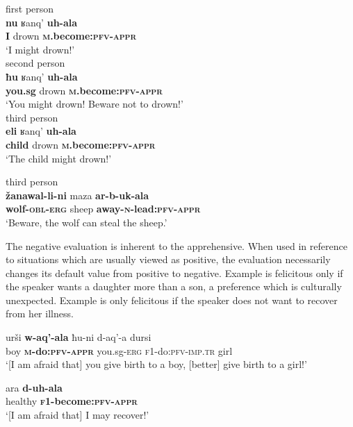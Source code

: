 \documentclass[output=paper,colorlinks,citecolor=brown]{langscibook}
\begin{document}
\ea \label{ex:DD37}
\ea \label{ex:DD37a} \textnormal{first person} \\
\gll \textbf{nu} ʁanq' \textbf{uh-ala} \\
\textbf{I} drown \textbf{\textsc{m}.become:\textsc{pfv-appr}} \\
\glt `I might drown!' \\
\ex \label{ex:DD37b} \textnormal{second person} \\
\gll \textbf{ħu} ʁanq' \textbf{uh-ala} \\
\textbf{you.sg} drown \textbf{\textsc{m}.become:\textsc{pfv-appr}} \\
\glt `You might drown! Beware not to drown!' \\
\ex \label{ex:DD37c} \textnormal{third person} \\
\gll \textbf{eli} ʁanq' \textbf{uh-ala} \\
\textbf{child} drown \textbf{\textsc{m}.become:\textsc{pfv-appr}} \\
\glt `The child might drown!'
\z
\z


\ea \label{ex:DD38} \textnormal{third person} \\
\gll \textbf{žanawal-li-ni} maza \textbf{ar-b-uk-ala} \\
\textbf{wolf-\textsc{obl-erg}} sheep \textbf{away-\textsc{n}-lead:\textsc{pfv-appr}} \\
\glt `Beware, the wolf can steal the sheep.'
\z


 The negative evaluation is inherent to the apprehensive. When used in reference to situations which are usually viewed as positive, the evaluation necessarily changes its default value from positive to negative. Example  is felicitous only if the speaker wants a daughter more than a son, a preference which is culturally unexpected. Example  is only felicitous if the speaker does not want to recover from her illness. 
 
\ea \label{ex:DD39}
\gll urši \textbf{w-aq'-ala} ħu-ni d-aq'-a dursi \\
boy \textbf{\textsc{m}-do:\textsc{pfv-appr}} you.sg\textsc{-erg} \textsc{f1}-do:\textsc{pfv-imp.tr} girl \\
\glt `[I am afraid that] you give birth to a boy, [better] give birth to a girl!'
\z

\ea \label{ex:DD40}
\gll ara \textbf{d-uh-ala} \\
healthy \textbf{\textsc{f1}-become:\textsc{pfv-appr}} \\
\glt `[I am afraid that] I may recover!'
\z
\end{document}
